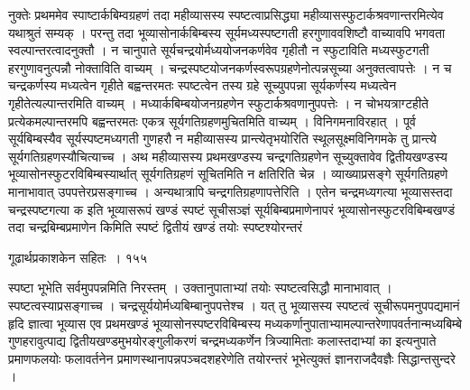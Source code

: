 \documentclass[11pt, openany]{book}
\begin{document}
\begin{sloppypar}
\noindent नुक्तेः प्रथममेव स्पाष्टार्कबिम्वग्रहणं तदा महीव्यासस्य स्पष्टत्वाप्रसिद्ध्या महीव्यासस्फुटार्कश्रवणान्तरमित्येव यथाश्रुतं सम्यक् । परन्तु तदा भूव्यासोनार्कबिम्बस्य सूर्यमध्यस्पष्टगती हरगुणाववशिष्टौ वाच्यावपि भगवता स्वल्पान्तरत्वादनुक्तौ । न चानुपाते सूर्यचन्द्रयोर्मध्ययोजनकर्णवेव गृहीतौ न स्फुटाविति मध्यस्फुटगती हरगुणावनुत्पन्नौ नोक्ताविति वाच्यम् । चन्द्रस्पष्टयोजनकर्णस्वरूपग्रहणेनोत्पन्नसूच्या अनुक्तत्वापत्तेः । न च चन्द्रकर्णस्य मध्यत्वेन गृहीते बह्वन्तरमतः स्पष्टत्वेन तस्य ग्रहे सूच्युपपन्ना सूर्यकर्णस्य मध्यत्वेन गृहीतेत्यल्पान्तरमिति वाच्यम् । मध्यार्कबिम्बयोजनग्रहणेन स्फुटार्कश्रवणानुपपत्तेः । न चोभयत्राग्टहीते प्रत्येकमल्पान्तरमपि बह्वन्तरमतः एकत्र सूर्यगतिग्रहणमुचितमिति वाच्यम् । विनिगमनाविरहात् । पूर्व सूर्यबिम्बस्यैव सूर्यस्पष्टमध्यगती गुणहरौ न महीव्यासस्य प्रान्त्येतृभयोरिति स्थूलसूक्ष्मविनिगमके तु प्रान्त्ये सूर्यगतिग्रहणस्यौचित्याच्च । अथ महीव्यासस्य प्रथमखण्डस्य चन्द्रगतिग्रहणेन सूच्युक्तावेव द्वितीयखण्डस्य भूव्यासोनस्फुटरविबिम्बस्यार्थात् सूर्यगतिग्रहणं सूचितमिति न क्षतिरिति चेन्न । व्याख्याप्रसङ्गे सूर्यगतिग्रहणे मानाभावात् उपपत्तेरप्रसङ्गाच्च । अन्यथात्रापि चन्द्रगतिग्रहणापत्तेरिति । एतेन चन्द्रमध्यगत्या भूव्यासस्तदा चन्द्रस्पष्टगत्या क इति भूव्यासरूपं खण्डं स्पष्टं सूचीसञ्ज्ञं सूर्यबिम्बप्रमाणेनापरं भूव्यासोनस्फुटरविबिम्बखण्डं तदा चन्द्रबिम्बप्रमाणेन किमिति स्पष्टं द्वितीयं खण्डं तयोः स्पष्टश्योरन्तरं
\end{sloppypar}


\newpage


\hspace{3cm} गूढार्थप्रकाशकेन सहितः~। \hfill १५५
\vspace{1cm}

\begin{sloppypar}
\noindent स्पष्टा भूभेति सर्वमुपपन्नमिति निरस्तम् । उक्तानुपाताभ्यां तयोः स्पष्टत्वसिद्धौ मानाभावात् । स्पष्टत्वस्याप्रसङ्गाच्च । चन्द्रसूर्ययोर्मध्यबिम्बानुपपत्तेश्च । यत् तु भूव्यासस्य स्पष्टत्वं सूचीरूपमनुपपद्यमानं हृदि ज्ञात्वा भूव्यास एव प्रथमखण्डं भूव्यासोनस्पष्टरविबिम्बस्य मध्यकर्णानुपाताभ्यामल्पान्तरेणापवर्तनान्मध्यबिम्बे गुणहरावुत्पाद्य द्वितीयखण्डमुभयोरङ्गुलीकरणं चन्द्रमध्यकर्णेन त्रिज्यामिताः कलास्तदाभ्यां का इत्यनुपाते प्रमाणफलयोः फलावर्तनेन प्रमाणस्थानापन्नपञ्चदशहरेणेति तयोरन्तरं भूभेत्युक्तं ज्ञानराजदैवज्ञैः सिद्धान्तसुन्दरे ।
\end{sloppypar}
\end{document}
